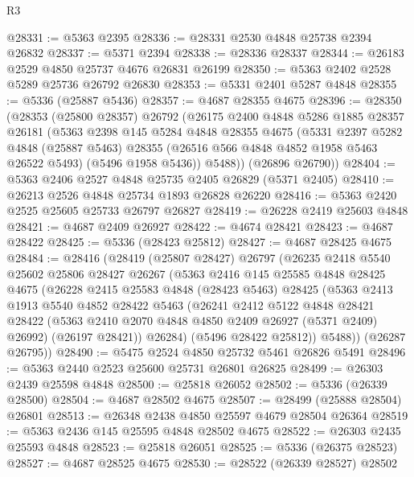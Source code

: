 \begin{lexlean}{R3}
\begin{coremodule}
@28331 := @5363 @2395
@28336 := @28331 @2530 @4848 @25738 @2394 @26832
@28337 := @5371 @2394
@28338 := @28336 @28337
@28344 := @26183 @2529 @4850 @25737 @4676 @26831 @26199
@28350 := @5363 @2402 @2528 @5289 @25736 @26792 @26830
@28353 := @5331 @2401 @5287 @4848
@28355 := @5336 (@25887 @5436)
@28357 := @4687 @28355 @4675
@28396 := @28350
    (@28353
      (@25800 @28357)
      @26792
      (@26175
        @2400
        @4848
        @5286
        @1885
        @28357
        @26181
        (@5363
          @2398
          @145
          @5284
          @4848
          @28355
          @4675
          (@5331
            @2397
            @5282
            @4848
            (@25887 @5463)
            @28355
            (@26516 @566 @4848 @4852 @1958 @5463 @26522 @5493)
            (@5496 @1958 @5436))
          @5488))
      (@26896 @26790))
@28404 := @5363 @2406 @2527 @4848 @25735 @2405 @26829 (@5371 @2405)
@28410 := @26213 @2526 @4848 @25734 @1893 @26828 @26220
@28416 := @5363 @2420 @2525 @25605 @25733 @26797 @26827
@28419 := @26228 @2419 @25603 @4848
@28421 := @4687 @2409 @26927
@28422 := @4674 @28421
@28423 := @4687 @28422
@28425 := @5336 (@28423 @25812)
@28427 := @4687 @28425 @4675
@28484 := @28416
    (@28419
      (@25807 @28427)
      @26797
      (@26235
        @2418
        @5540
        @25602
        @25806
        @28427
        @26267
        (@5363
          @2416
          @145
          @25585
          @4848
          @28425
          @4675
          (@26228
            @2415
            @25583
            @4848
            (@28423 @5463)
            @28425
            (@5363
              @2413
              @1913
              @5540
              @4852
              @28422
              @5463
              (@26241
                @2412
                @5122
                @4848
                @28421
                @28422
                (@5363 @2410 @2070 @4848 @4850 @2409 @26927 (@5371 @2409) @26992)
                (@26197 @28421))
              @26284)
            (@5496 @28422 @25812))
          @5488))
      (@26287 @26795))
@28490 := @5475 @2524 @4850 @25732 @5461 @26826 @5491
@28496 := @5363 @2440 @2523 @25600 @25731 @26801 @26825
@28499 := @26303 @2439 @25598 @4848
@28500 := @25818 @26052
@28502 := @5336 (@26339 @28500)
@28504 := @4687 @28502 @4675
@28507 := @28499 (@25888 @28504) @26801
@28513 := @26348 @2438 @4850 @25597 @4679 @28504 @26364
@28519 := @5363 @2436 @145 @25595 @4848 @28502 @4675
@28522 := @26303 @2435 @25593 @4848
@28523 := @25818 @26051
@28525 := @5336 (@26375 @28523)
@28527 := @4687 @28525 @4675
@28530 := @28522 (@26339 @28527) @28502

\end{coremodule}
\end{lexlean}
